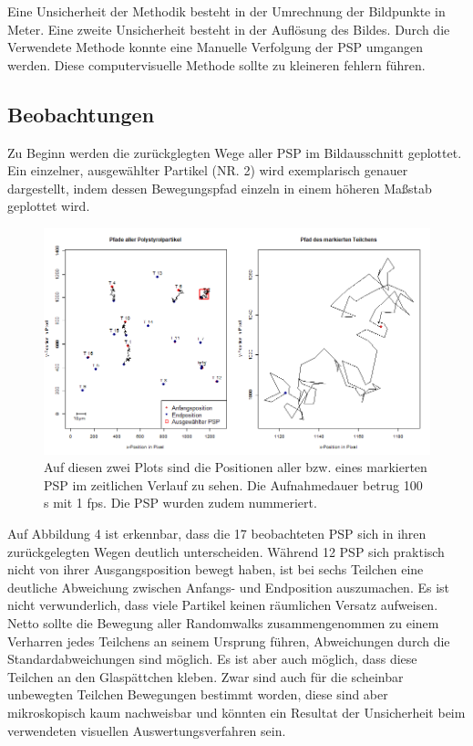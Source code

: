 \documentclass[
  9pt,
]{article}
\begin{document}
Eine Unsicherheit der Methodik besteht in der Umrechnung der Bildpunkte
in Meter. Eine zweite Unsicherheit besteht in der Auflösung des Bildes.
Durch die Verwendete Methode konnte eine Manuelle Verfolgung der PSP
umgangen werden. Diese computervisuelle Methode sollte zu kleineren
fehlern führen.

\hypertarget{beobachtungen}{%
\subsection{Beobachtungen}\label{beobachtungen}}

Zu Beginn werden die zurückglegten Wege aller PSP im Bildausschnitt
geplottet. Ein einzelner, ausgewählter Partikel (NR. 2) wird
exemplarisch genauer dargestellt, indem dessen Bewegungspfad einzeln in
einem höheren Maßstab geplottet wird.

\begin{figure}
\centering
\includegraphics[width=\textwidth,height=0.2\textheight]{code/Plots/Raum.png}
\caption{Auf diesen zwei Plots sind die Positionen aller bzw. eines
markierten PSP im zeitlichen Verlauf zu sehen. Die Aufnahmedauer betrug
100 s mit 1 fps. Die PSP wurden zudem nummeriert.}
\end{figure}

Auf Abbildung 4 ist erkennbar, dass die 17 beobachteten PSP sich in
ihren zurückgelegten Wegen deutlich unterscheiden. Während 12 PSP sich
praktisch nicht von ihrer Ausgangsposition bewegt haben, ist bei sechs
Teilchen eine deutliche Abweichung zwischen Anfangs- und Endposition
auszumachen. Es ist nicht verwunderlich, dass viele Partikel keinen
räumlichen Versatz aufweisen. Netto sollte die Bewegung aller
Randomwalks zusammengenommen zu einem Verharren jedes Teilchens an
seinem Ursprung führen, Abweichungen durch die Standardabweichungen sind
möglich. Es ist aber auch möglich, dass diese Teilchen an den
Glaspättchen kleben. Zwar sind auch für die scheinbar unbewegten
Teilchen Bewegungen bestimmt worden, diese sind aber mikroskopisch kaum
nachweisbar und könnten ein Resultat der Unsicherheit beim verwendeten
visuellen Auswertungsverfahren sein.
\end{document}
